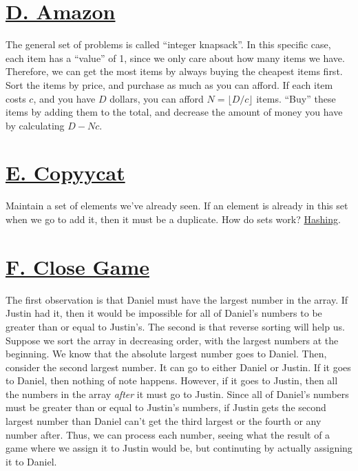 \documentclass[11pt, oneside]{article}
\begin{document}
\section{\href{https://codeforces.com/group/XaPbwwWypc/contest/275182/problem/D}{D. Amazon}}
The general set of problems is called ``integer knapsack''. In this specific case,
each item has a ``value'' of 1, since we only care about how many items we have. Therefore, we can get the most items
by always buying the cheapest items first.
Sort the items by price, and purchase as much as you can afford.
If each item costs \( c \), and you have \( D \) dollars, you can
afford \( N = \lfloor D/c \rfloor \) items. ``Buy'' these items
by adding them to the total, and decrease the amount of money you have by
calculating \( D - Nc \).

\section{\href{https://codeforces.com/group/XaPbwwWypc/contest/275182/problem/E}{E. Copyycat}}

Maintain a set of elements we've already seen. If an element is already
in this set when we go to add it, then it must be a duplicate.
How do sets work? \href{https://runestone.academy/runestone/books/published/pythonds/SortSearch/Hashing.html}{Hashing}.

\section{\href{https://codeforces.com/group/XaPbwwWypc/contest/275182/problem/F}{F. Close Game}}

The first observation is that Daniel must have the largest number in the array.
If Justin had it, then it would be impossible for all of Daniel's numbers to
be greater than or equal to Justin's. The second is that reverse sorting will help us.
Suppose we sort the array in decreasing order, with the largest numbers at the beginning. We know that the absolute largest number goes to Daniel. Then,
consider the second largest number. It can go to either Daniel or Justin.
If it goes to Daniel, then nothing of note happens. However, if it goes to Justin,
then all the numbers in the array \textit{after} it must go to Justin.
Since all of Daniel's numbers must be greater than or equal to Justin's numbers,
if Justin gets the second largest number than Daniel can't get the third largest
or the fourth or any number after. Thus, we can process each number,
seeing what the result of a game where we assign it to Justin would be,
but continuting by actually assigning it to Daniel.
\end{document}
